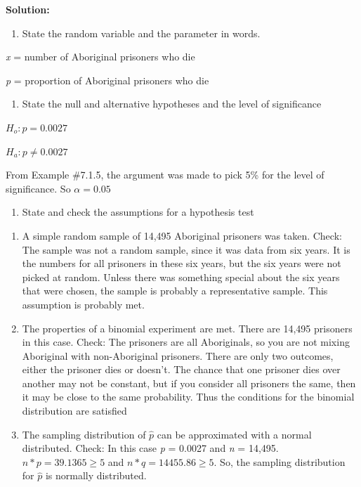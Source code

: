 \documentclass[
]{book}
\providecommand{\tightlist}{%
  \setlength{\itemsep}{0pt}\setlength{\parskip}{0pt}}
\begin{document}
\textbf{Solution:}

\begin{enumerate}
\def\labelenumi{\arabic{enumi}.}
\tightlist
\item
  State the random variable and the parameter in words.
\end{enumerate}

\emph{x} = number of Aboriginal prisoners who die

\emph{p} = proportion of Aboriginal prisoners who die

\begin{enumerate}
\def\labelenumi{\arabic{enumi}.}
\setcounter{enumi}{1}
\tightlist
\item
  State the null and alternative hypotheses and the level of significance
\end{enumerate}

\(H_o:p=0.0027\)

\(H_a:p\ne0.0027\)

From Example \#7.1.5, the argument was made to pick 5\% for the level of significance. So \(\alpha=0.05\)

\begin{enumerate}
\def\labelenumi{\arabic{enumi}.}
\setcounter{enumi}{2}
\tightlist
\item
  State and check the assumptions for a hypothesis test
\end{enumerate}

\begin{enumerate}
\def\labelenumi{\alph{enumi}.}
\item
  A simple random sample of 14,495 Aboriginal prisoners was taken. Check: The sample was not a random sample, since it was data from six years. It is the numbers for all prisoners in these six years, but the six years were not picked at random. Unless there was something special about the six years that were chosen, the sample is probably a representative sample. This assumption is probably met.
\item
  The properties of a binomial experiment are met. There are 14,495 prisoners in this case. Check: The prisoners are all Aboriginals, so you are not mixing Aboriginal with non-Aboriginal prisoners. There are only two outcomes, either the prisoner dies or doesn't. The chance that one prisoner dies over another may not be constant, but if you consider all prisoners the same, then it may be close to the same probability. Thus the conditions for the binomial distribution are satisfied
\item
  The sampling distribution of \(\hat{p}\) can be approximated with a normal distributed. Check: In this case \emph{p} = 0.0027 and \emph{n} = 14,495. \(n*p=39.1365\ge5\) and \(n*q=14455.86\ge5\). So, the sampling distribution for \(\hat{p}\) is normally distributed.
\end{enumerate}
\end{document}
